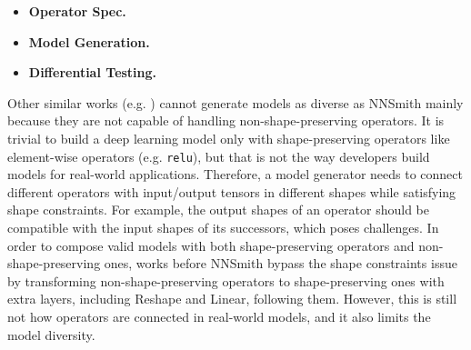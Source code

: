 \documentclass{article}
\begin{document}
\begin{itemize}
    \item \textbf{Operator Spec.}
    \item \textbf{Model Generation.}
    \item \textbf{Differential Testing.}
\end{itemize}

Other similar works (e.g. ) cannot generate models as diverse as NNSmith mainly because they are not capable of handling non-shape-preserving operators. It is trivial to build a deep learning model only with shape-preserving operators like element-wise operators (e.g. \texttt{relu}), but that is not the way developers build models for real-world applications. Therefore, a model generator needs to connect different operators with input/output tensors in different shapes while satisfying shape constraints. For example, the output shapes of an operator should be compatible with the input shapes of its successors, which poses challenges. In order to compose valid models with both shape-preserving operators and non-shape-preserving ones, works before NNSmith bypass the shape constraints issue by transforming non-shape-preserving operators to shape-preserving ones with extra layers, including Reshape and Linear, following them. However, this is still not how operators are connected in real-world models, and it also limits the model diversity.
\end{document}
